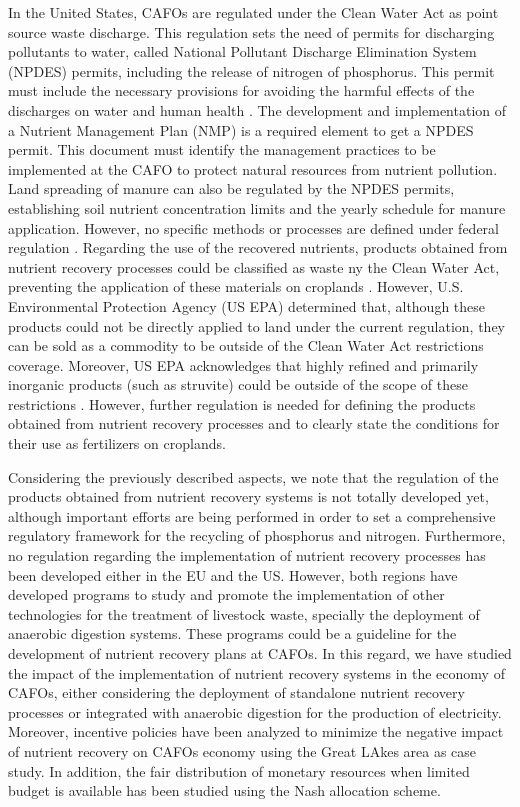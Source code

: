 \begin{refsection}[referencesCh1]
In the United States, CAFOs are regulated under the Clean Water Act as point source waste discharge. This regulation sets the need of permits for discharging pollutants to water, called National Pollutant Discharge Elimination System (NPDES) permits, including the release of nitrogen of phosphorus. This permit must include the necessary provisions for avoiding the harmful effects of the discharges on water and human health \citep{NPDE_basics}. The development and implementation of a Nutrient Management Plan (NMP) is a required element to get a NPDES permit. This document must identify the management practices to be implemented at the CAFO to protect natural resources from nutrient pollution. Land spreading of manure can also be regulated by the NPDES permits, establishing soil nutrient concentration limits and the yearly schedule for manure application. However, no specific methods or processes are defined under federal regulation \citep{NPDESforCAFO}. Regarding the use of the recovered nutrients, products obtained from nutrient recovery processes could be classified as waste ny the Clean Water Act, preventing the application of these materials on croplands \citep{NACWA503}. However, U.S. Environmental Protection Agency (US EPA) determined that, although these products could not be directly applied to land under the current regulation, they can be sold as a commodity to be outside of the Clean Water Act restrictions coverage. Moreover, US EPA acknowledges that highly refined and primarily inorganic products (such as struvite) could be outside of the scope of these restrictions \citep{CNP503}. However, further regulation is needed for defining the products obtained from nutrient recovery processes and to clearly state the conditions for their use as fertilizers on croplands.

Considering the previously described aspects, we note that the regulation of the products obtained from nutrient recovery systems is not totally developed yet, although important efforts are being performed in order to set a comprehensive regulatory framework for the recycling of phosphorus and nitrogen. Furthermore, no regulation regarding the implementation of nutrient recovery processes has been developed either in the EU and the US. However, both regions have developed programs to study and promote the implementation of other technologies for the treatment of livestock waste, specially the deployment of anaerobic digestion systems. These programs could be a guideline for the development of nutrient recovery plans at CAFOs. In this regard, we have studied the impact of the implementation of nutrient recovery systems in the economy of CAFOs, either considering the deployment of standalone nutrient recovery processes or integrated with anaerobic digestion for the production of electricity. Moreover, incentive policies have been analyzed to minimize the negative impact of nutrient recovery on CAFOs economy using the Great LAkes area as case study. In addition, the fair distribution of monetary resources when limited budget is available has been studied using the Nash allocation scheme. 


\end{refsection}
